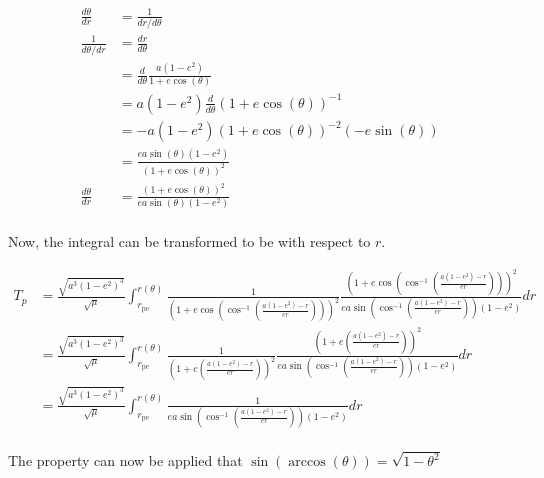 \documentclass{article}
\begin{document}
\begin{align*}
    \frac{d\theta}{dr}   & = \frac{1}{dr/d\theta}                             \\
    \frac{1}{d\theta/dr} & = \frac{dr}{d\theta}                               \\
                         & =\frac{d}{d\theta}\frac{a(1-e^2)}{1+e\cos(\theta)} \\
                         & =a(1-e^2)\frac{d}{d\theta}(1+e\cos(\theta))^{-1}   \\
                         & =-a(1-e^2)(1+e\cos(\theta))^{-2}(-e\sin(\theta))   \\
                         & =\frac{ea\sin(\theta)(1-e^2)}{(1+e\cos(\theta))^2} \\
    \frac{d\theta}{dr}   & =\frac{(1+e\cos(\theta))^2}{ea\sin(\theta)(1-e^2)} \\
\end{align*}

Now, the integral can be transformed to be with respect to $r$.

\begin{align*}
    T_p & = \frac{\sqrt{a^3(1-e^2)^3}}{\sqrt{\mu}}\int_{r_\text{pe}}^{r(\theta)}\frac{1}{\left(1+e\cos\left(\cos^{-1}\left(\frac{a(1-e^2)-r}{er}\right)\right)\right)^2}\frac{\left(1+e\cos\left(\cos^{-1}\left(\frac{a(1-e^2)-r}{er}\right)\right)\right)^2}{ea\sin\left(\cos^{-1}\left(\frac{a(1-e^2)-r}{er}\right)\right)(1-e^2)}dr \\
        & =\frac{\sqrt{a^3(1-e^2)^3}}{\sqrt{\mu}}\int_{r_\text{pe}}^{r(\theta)}\frac{1}{\left(1+e\left(\frac{a(1-e^2)-r}{er}\right)\right)^2}\frac{\left(1+e\left(\frac{a(1-e^2)-r}{er}\right)\right)^2}{ea\sin\left(\cos^{-1}\left(\frac{a(1-e^2)-r}{er}\right)\right)(1-e^2)}dr                                                      \\
        & =\frac{\sqrt{a^3(1-e^2)^3}}{\sqrt{\mu}}\int_{r_\text{pe}}^{r(\theta)}\frac{1}{ea\sin\left(\cos^{-1}\left(\frac{a(1-e^2)-r}{er}\right)\right)(1-e^2)}dr                                                                                                                                                                       \\
\end{align*}

The property can now be applied that $\sin(\arccos(\theta))=\sqrt{1-\theta^2}$
\end{document}
